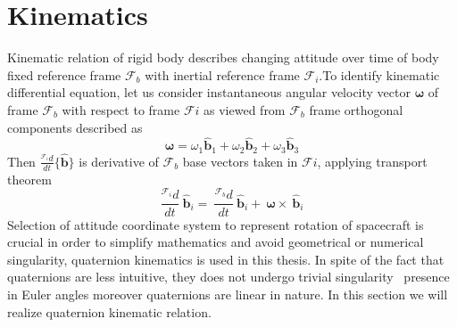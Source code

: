\section{Kinematics}
Kinematic relation of rigid body describes changing attitude over time of body fixed reference frame $\displaystyle \mathcal{F}_{b}$ with inertial reference frame $\displaystyle \mathcal{F}_{i}$.To identify kinematic differential equation, let us consider instantaneous angular velocity vector $\displaystyle \mathbf{\omega }$ of frame $\displaystyle \mathcal{F}_{b}$ with respect to frame $\displaystyle \mathcal{F} i$ as viewed from $\displaystyle \mathcal{F}_{b}$ frame orthogonal components described as
\begin{equation*}
\mathbf{\omega } =\omega_{1}\hat{\mathbf{b}}_{1} +\omega_{2}\hat{\mathbf{b}}_{2} +\omega_{3}\hat{\mathbf{b}}_{3}
\end{equation*}
Then $\displaystyle \frac{^{\mathcal{F}_{i}}d}{dt}\{\hat{\mathbf{b}}\}$ is derivative of $\displaystyle \mathcal{F}_{b}$ base vectors taken in $\displaystyle \mathcal{F} i$, applying transport theorem
\begin{equation}
\frac{^{\mathcal{F}_{i}} d}{dt} \ \hat{\mathbf{b}}_{i} =\ \frac{^{\mathcal{F}_{b}} d}{dt} \ \hat{\mathbf{b}}_{i} +\ \mathbf{\omega } \times \ \hat{\mathbf{b}}_{i}
\end{equation}
Selection of attitude coordinate system to represent rotation of spacecraft is crucial in order to simplify mathematics and avoid geometrical or numerical singularity, quaternion kinematics is used in this thesis. In spite of the fact that quaternions are less intuitive, they does not undergo trivial singularity \ presence in Euler angles moreover quaternions are linear in nature. In this section we will realize quaternion kinematic relation.

